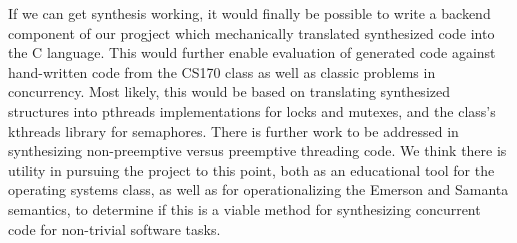 If we can get synthesis working, it would finally be possible to write a backend component of our progject which mechanically translated synthesized code into the C language.  This would further enable evaluation of generated code against hand-written code from the CS170 class as well as classic problems in concurrency.  Most likely, this would be based on translating synthesized structures into pthreads implementations for locks and mutexes, and the class's kthreads library for semaphores.  There is further work to be addressed in synthesizing non-preemptive versus preemptive threading code.  We think there is utility in pursuing the project to this point, both as an educational tool for the operating systems class, as well as for operationalizing the Emerson and Samanta semantics, to determine if this is a viable method for synthesizing concurrent code for non-trivial software tasks.
